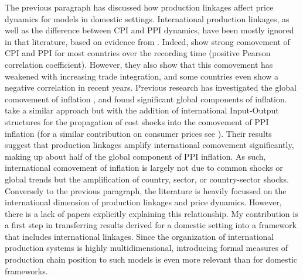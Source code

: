 The previous paragraph has discussed how production linkages affect price dynamics for models in domestic settings. International 
production linkages, as well as the difference between CPI and PPI dynamics, have been mostly ignored in that literature, based on evidence 
from \textcite{nakamura2008FiveFactsPrices}. Indeed, \textcite{weiWedgeCenturyUnderstanding2018} show strong comovement of CPI and PPI 
for most countries over the recording time (positive Pearson correlation coefficient). However, they also show that this comovement 
has weakened with increasing trade integration, and some countries even show a negative correlation in recent years. Previous research
has investigated the global comovement of inflation \parencite{ciccarelli2010GlobalInflation,monacelli2009InternationalDimensionInflation}, 
and found significant global components of inflation. \textcite{auer2019InternationalInflationSpillovers} take a similar approach 
but with the addition of international Input-Output structures for the propagation of cost shocks into the comovement of PPI inflation 
(for a similar contribution on consumer prices see \textcite{auerGlobalisationInflationGrowing2017}). Their results suggest that production 
linkages amplify international comovement significantly, making up about half of the global component of PPI inflation. As such, 
international comovement of inflation is largely not due to common shocks or global trends but the amplification of country, sector, or 
country-sector shocks. Conversely to the previous paragraph, the literature is heavily focussed on the international dimension 
of production linkages and price dynamics. However, there is a lack of papers explicitly explaining this relationship. My contribution 
is a first step in transferring results derived for a domestic setting into a framework that includes international linkages. Since the 
organization of international production systems is highly multidimensional, introducing formal measures of production chain position 
to such models is even more relevant than for domestic frameworks.\\
